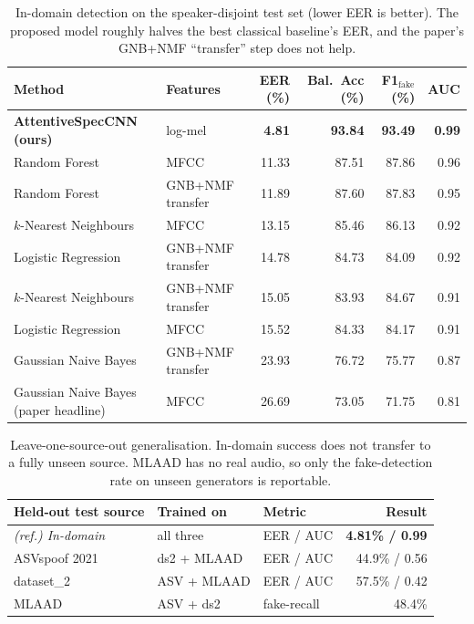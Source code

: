 \begin{table}[t]
\centering
\caption{In-domain detection on the speaker-disjoint test set (lower EER is
better). The proposed model roughly halves the best classical baseline's EER,
and the paper's GNB+NMF ``transfer'' step does not help.}
\label{tab:indomain}
\begin{tabular}{@{}llrrrr@{}}
\toprule
Method & Features & EER (\%) & Bal.\ Acc (\%) & F1$_{\text{fake}}$ (\%) & AUC \\
\midrule
\textbf{AttentiveSpecCNN (ours)}     & log-mel           & \textbf{4.81}  & \textbf{93.84} & \textbf{93.49} & \textbf{0.99} \\
Random Forest                        & MFCC              & 11.33 & 87.51 & 87.86 & 0.96 \\
Random Forest                        & GNB+NMF transfer  & 11.89 & 87.60 & 87.83 & 0.95 \\
$k$-Nearest Neighbours               & MFCC              & 13.15 & 85.46 & 86.13 & 0.92 \\
Logistic Regression                  & GNB+NMF transfer  & 14.78 & 84.73 & 84.09 & 0.92 \\
$k$-Nearest Neighbours               & GNB+NMF transfer  & 15.05 & 83.93 & 84.67 & 0.91 \\
Logistic Regression                  & MFCC              & 15.52 & 84.33 & 84.17 & 0.91 \\
Gaussian Naive Bayes                 & GNB+NMF transfer  & 23.93 & 76.72 & 75.77 & 0.87 \\
Gaussian Naive Bayes (paper headline)& MFCC              & 26.69 & 73.05 & 71.75 & 0.81 \\
\bottomrule
\end{tabular}
\end{table}

\begin{table}[t]
\centering
\caption{Leave-one-source-out generalisation. In-domain success does not
transfer to a fully unseen source. MLAAD has no real audio, so only the
fake-detection rate on unseen generators is reportable.}
\label{tab:cross}
\begin{tabular}{@{}lllr@{}}
\toprule
Held-out test source & Trained on & Metric & Result \\
\midrule
\textit{(ref.) In-domain} & all three      & EER / AUC & \textbf{4.81\% / 0.99} \\
ASVspoof 2021             & ds2 + MLAAD    & EER / AUC & 44.9\% / 0.56 \\
dataset\_2                & ASV + MLAAD    & EER / AUC & 57.5\% / 0.42 \\
MLAAD                     & ASV + ds2      & fake-recall & 48.4\% \\
\bottomrule
\end{tabular}
\end{table}


